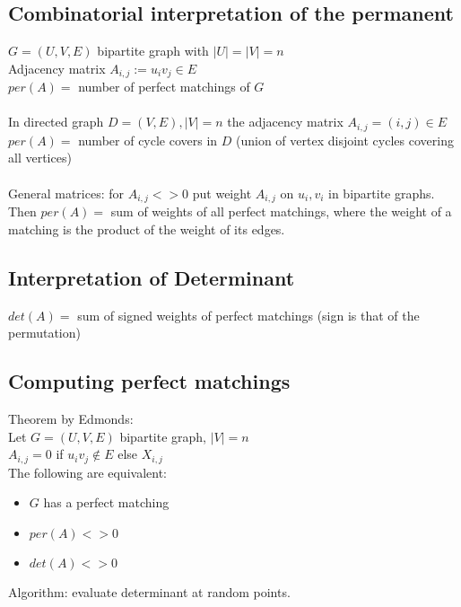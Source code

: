 \documentclass[12pt]{article}
\begin{document}
\subsection{Combinatorial interpretation of the permanent}
$G = (U,V,E)$ bipartite graph with $|U| = |V| = n$\\
Adjacency matrix $A_{i,j} := u_i v_j \in E$\\
$per(A) =$ number of perfect matchings of $G$\\\\

In directed graph $D = (V,E), |V| = n$ the adjacency matrix $A_{i,j} = (i,j) \in E$\\
$per(A) =$ number of cycle covers in $D$ (union of vertex disjoint cycles covering all vertices)\\\\

General matrices: for $A_{i,j} <> 0$ put weight $A_{i,j}$ on $u_i, v_i$ in  bipartite graphs.\\
Then $per(A) =$ sum of weights of all perfect matchings, where the weight of a matching is the product of the weight of its edges.\\

\subsection{Interpretation of Determinant}
$det(A) =$ sum of signed weights of perfect matchings (sign is that of the permutation)\\

\subsection{Computing perfect matchings}
Theorem by Edmonds:\\
Let $G=(U,V,E)$ bipartite graph, $|V| = n$\\
$A_{i,j} = 0$ if $u_i v_j \notin E$ else $X_{i,j}$\\
The following are equivalent:
\begin{itemize}
\item $G$ has a perfect matching
\item $per(A) <> 0$
\item $det(A) <> 0$
\end{itemize}
Algorithm: evaluate determinant at random points.\\
\end{document}

